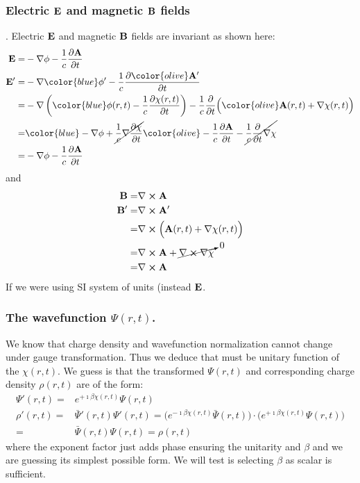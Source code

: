 \documentclass[11pt]{article}
\begin{document}
\subsubsection{Electric $\vb E$ and magnetic $\vb B$ fields}. 
 Electric $\vb E$ and magnetic $\vb B$ fields are invariant as shown here:
\begin{align}
    \vb E  =&  - \nabla \phi  - \frac{1}{c} \pdv{\vb A}{t} \label{eq:Psi_gauge_transf}\\
    \vb E' =&  - \nabla {\color{blue} \phi'} -  \frac{1}{c} \pdv{ \color{olive} \vb A'}{t} \nonumber \\
           =&  -\nabla \left({ \color{blue} \phi(r,t)   -   \frac{1}{c} \pdv{\chi(r,t)}{t} } \right) 
              -   \frac{1}{c}  \pdv{}{t} \Big( {\color{olive}    \vb A(r,t)  +  \nabla  \chi(r,t)   }\Big)   \nonumber \\
      =&  { \color{blue}  - \nabla \phi  +  \cancel{  \frac{1}{c}  \nabla \pdv{\chi}{t} } }
        {\color{olive}  -  \frac{1}{c} \pdv{\vb A}{t}  -  \cancel{ \frac{1}{c}  \pdv{}{t} \nabla \chi } }  \nonumber \\
           = & - \nabla \phi  -  \frac{1}{c} \pdv{\vb A}{t} \nonumber
\end{align}
and 
\begin{align*}
    \vb  B =&   \nabla \cross \vb A \\
    \vb  B' =&   \nabla \cross \vb A' \\
            =&  \nabla \cross \Big( \vb A(r,t)  +  \nabla  \chi(r,t) \Big)\\
            =&   \nabla \cross \vb A  + \cancelto{0}{ \nabla \cross \nabla \chi } \\
            = & \nabla \cross \vb A 
\end{align*}
If we were using  SI  system of units (instead $\vb E$.


\subsubsection{The wavefunction $\Psi(r,t)$.}

We know that  charge density and wavefunction normalization cannot change  under gauge transformation. Thus we deduce that  must be  unitary function of the $\chi(r,t)$. We guess is  that the transformed  $\Psi(r,t)$  and corresponding charge density  $\rho(r,t)$ are of the form:
\begin{align*}
    \Psi'(r,t) = & e^{+\imath \beta \chi(r,t) } \Psi(r,t) \\
    \rho'(r,t) = &   \bar \Psi'(r,t) \Psi'(r,t)  =   \big( e^{-\imath \beta \chi(r,t) } \bar \Psi(r,t)\big) \cdot \big(e^{+\imath \beta \chi(r,t) }\Psi(r,t) \big) \\
    =&   \bar \Psi(r,t) \Psi(r,t)  =   \rho(r,t)
\end{align*}
where the exponent factor just adds phase  ensuring the unitarity and $\beta$ and  we are guessing its simplest possible form. We will  test is selecting  $\beta$ as scalar is sufficient.
\end{document}
